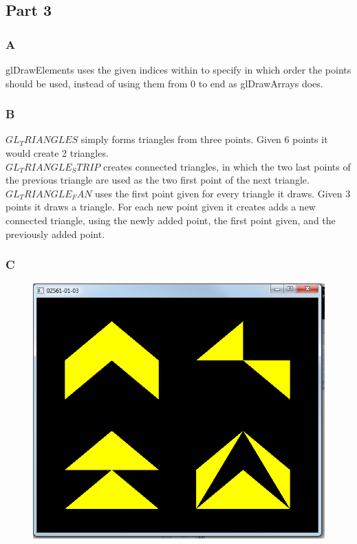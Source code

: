 \documentclass[11pt]{article}
\begin{document}
\subsection{Part 3}
\subsubsection{A}
glDrawElements uses the given indices within to specify in which order the points should be used, instead of using them from 0 to end as glDrawArrays does.

\subsubsection{B}
$ GL_TRIANGLES $ simply forms triangles from three points. Given 6 points it would create 2 triangles.\\

\noindent $ GL_TRIANGLE_STRIP $ creates connected triangles, in which the two last points of the previous triangle are used as the two first point of the next triangle.\\

\noindent $ GL_TRIANGLE_FAN $ uses the first point given for every triangle it draws. Given 3 points it draws a triangle. For each new point given it creates adds a new connected triangle, using the newly added point, the first point given, and the previously added point.

\subsubsection{C}
\begin{figure}[H]
	\centering
	\includegraphics[width=0.5\linewidth]{images/e01p3c}
	\label{fig:e01p3c}
\end{figure}
\end{document}
